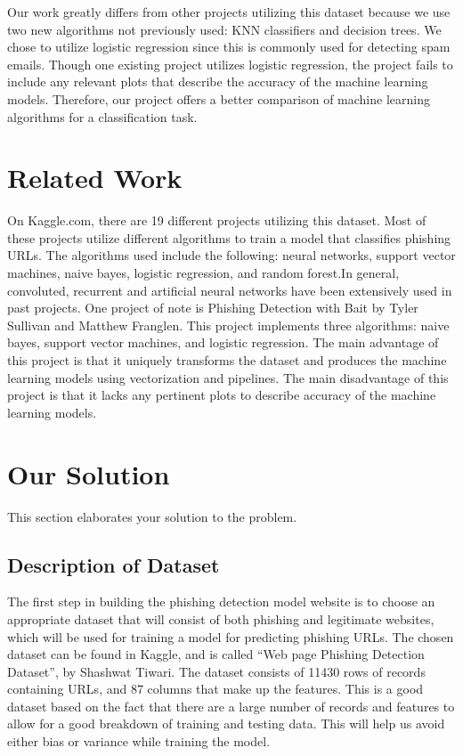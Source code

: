 \documentclass[conference]{IEEEtran}
\begin{document}
Our work greatly differs from other projects utilizing this dataset because we use two new algorithms not previously used: KNN classifiers and decision trees. We chose to utilize logistic regression since this is commonly used for detecting spam emails. Though one existing project utilizes logistic regression, the project fails to include any relevant plots that describe the accuracy of the machine learning models. Therefore, our project offers a better comparison of machine learning algorithms for a classification task. 


\section{Related Work}
On Kaggle.com, there are 19 different projects utilizing this dataset. Most of these projects utilize different algorithms to train a model that classifies phishing URLs. The algorithms  used include the following: neural networks, support vector machines, naive bayes, logistic regression, and random forest.In general, convoluted, recurrent and artificial neural networks have been extensively used in past projects. One project of note is Phishing Detection with Bait by Tyler Sullivan and Matthew Franglen. This project implements three algorithms: naive bayes, support vector machines, and logistic regression. The main advantage of this project is that it uniquely transforms the dataset and produces the machine learning models using vectorization and pipelines. The main disadvantage of this project is that it lacks any pertinent plots to describe accuracy of  the machine learning models.   

\section{Our Solution}
This section elaborates your solution to the problem.

\subsection{Description of Dataset}
The first step in building the phishing detection model website is to choose an appropriate dataset that will consist of both phishing and legitimate websites, which will be used for training a model for predicting phishing URLs. The chosen dataset can be found in Kaggle, and is called  “Web page Phishing Detection Dataset”, by Shashwat Tiwari. The dataset consists of 11430 rows of records containing URLs, and 87 columns that make up the features. This is a good dataset based on the fact that there are a large number of records and features to allow for a good breakdown of training and testing data. This will help us avoid either bias or variance while training the model. 
\end{document}
